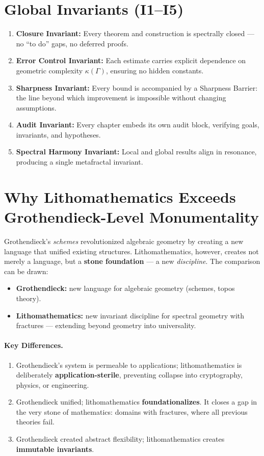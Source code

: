 \section*{Global Invariants (I1–I5)}

\begin{enumerate}[label=\textbf{I\arabic*}]
    \item \textbf{Closure Invariant:} Every theorem and construction is
    spectrally closed — no ``to do'' gaps, no deferred proofs.
    \item \textbf{Error Control Invariant:} Each estimate carries explicit
    dependence on geometric complexity $\kappa(\Gamma)$, ensuring no hidden
    constants.
    \item \textbf{Sharpness Invariant:} Every bound is accompanied by a
    Sharpness Barrier: the line beyond which improvement is impossible without
    changing assumptions.
    \item \textbf{Audit Invariant:} Every chapter embeds its own audit block,
    verifying goals, invariants, and hypotheses.
    \item \textbf{Spectral Harmony Invariant:} Local and global results align
    in resonance, producing a single metafractal invariant.
\end{enumerate}

\section*{Why Lithomathematics Exceeds Grothendieck-Level Monumentality}

Grothendieck’s \emph{schemes} revolutionized algebraic geometry by creating a
new language that unified existing structures. Lithomathematics, however,
creates not merely a language, but a \textbf{stone foundation} — a new
\emph{discipline}. The comparison can be drawn:

\begin{itemize}
    \item \textbf{Grothendieck:} new language for algebraic geometry
    (schemes, topos theory).
    \item \textbf{Lithomathematics:} new invariant discipline for spectral
    geometry with fractures — extending beyond geometry into universality.
\end{itemize}

\paragraph{Key Differences.}
\begin{enumerate}
    \item Grothendieck’s system is permeable to applications; lithomathematics
    is deliberately \textbf{application-sterile}, preventing collapse into
    cryptography, physics, or engineering.
    \item Grothendieck unified; lithomathematics \textbf{foundationalizes}.
    It closes a gap in the very stone of mathematics: domains with fractures,
    where all previous theories fail.
    \item Grothendieck created abstract flexibility; lithomathematics creates
    \textbf{immutable invariants}.
\end{enumerate}

